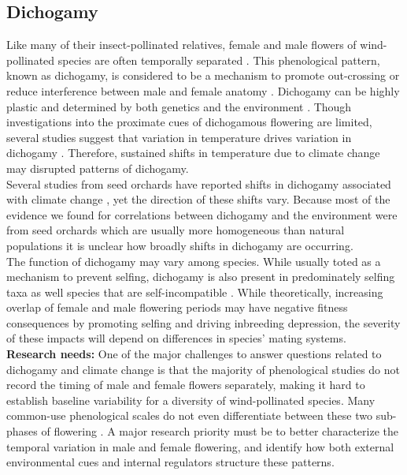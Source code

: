 \documentclass[11pt]{article}
\begin{document}
\subsection*{Dichogamy}
\noindent Like many of their insect-pollinated relatives, female and male flowers of wind-pollinated species are often temporally separated \citep{Bertin:1993aa}. This phenological pattern, known as dichogamy, is considered to be a mechanism to promote out-crossing \citep{Bertin:1993ab}or reduce interference between male and female anatomy \citep{Lloyd:1986aa,Routley:2004aa}. Dichogamy can be highly plastic and determined by both genetics and the environment \citep{Friedman2011}. Though investigations into the proximate cues of dichogamous flowering are limited, several studies suggest that variation in temperature drives variation in dichogamy \citep{Gabriel:1986aa,Schaffer1994,Alexander2016}. Therefore, sustained shifts in temperature due to climate change may disrupted patterns of dichogamy.\\

\noindent Several studies from seed orchards have reported shifts in dichogamy associated with climate change \citep{Alizoti2010,Mutke:2005aa,Elkassaby1991}, yet the direction of these shifts vary. Because most of the evidence we found for correlations between dichogamy and the environment were from seed orchards which are usually more homogeneous than natural populations it is unclear how broadly shifts in dichogamy are occurring.\\

\noindent The function of dichogamy may vary among species. While usually toted as a mechanism to prevent selfing, dichogamy is also present in predominately selfing taxa \citep{Friedman:2009ab} as well species that are self-incompatible \citep{Lloyd:1986aa,Routley:2004aa}. While theoretically, increasing overlap of female and male flowering periods may have negative fitness consequences by promoting selfing and driving inbreeding depression, the severity of these impacts will depend on differences in species' mating systems.\\ 

\textbf{Research needs:} One of the major challenges to answer questions related to dichogamy and climate change is that the majority of phenological studies do not record the timing of male and female flowers separately, making it hard to establish baseline variability for a diversity of wind-pollinated species. Many common-use phenological scales do not even differentiate between these two sub-phases of flowering \citep[e.g. the BBCH scale,][]{Finn2007}. A major research priority must be to better characterize the temporal variation in male and female flowering, and identify how both external environmental cues and internal regulators structure these patterns.\\
\end{document}
